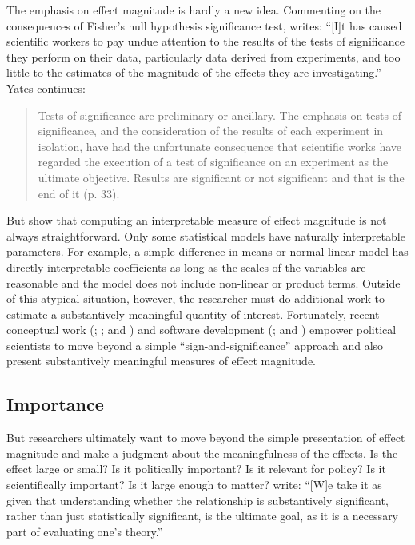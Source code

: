 \documentclass[12pt]{article}
\begin{document}
The emphasis on effect magnitude is hardly a new idea. Commenting on the consequences of Fisher's null hypothesis significance test, \citet[p. 32]{Yates1951} writes: ``[I]t has caused scientific workers to pay undue attention to the results of the tests of significance they perform on their data, particularly data derived from experiments, and too little to the estimates of the magnitude of the effects they are investigating.'' Yates continues: 

\begin{quote}
Tests of significance are preliminary or ancillary. The emphasis on tests of significance, and the consideration of the results of each experiment in isolation, have had the unfortunate consequence that scientific works have regarded the execution of a test of significance on an experiment as the ultimate objective. Results are significant or not significant and that is the end of it (p. 33).
\end{quote}

But \cite{KingTomzWittenberg2000} show that computing an interpretable measure of effect magnitude is not always straightforward. Only some statistical models have naturally interpretable parameters. For example, a simple difference-in-means or normal-linear model has directly interpretable coefficients as long as the scales of the variables are reasonable and the model does not include non-linear or product terms. Outside of this atypical situation, however, the researcher must do additional work to estimate a substantively meaningful quantity of interest. Fortunately, recent conceptual work (\citealt{KingTomzWittenberg2000}; \citealt{BerryDeMerittEsarey2010}; and \citealt{HanmerKalkan2013}) and software development (\citealt{TomzWittenbergKing2003}; and \citealt{ImaiKingLau2007}) empower political scientists to move beyond a simple ``sign-and-significance'' approach and also present substantively meaningful measures of effect magnitude. 

\subsection*{Importance}

But researchers ultimately want to move beyond the simple presentation of effect magnitude and make a judgment about the meaningfulness of the effects. Is the effect large or small? Is it politically important? Is it relevant for policy? Is it scientifically important? Is it large enough to matter? \citet[p. 264]{HanmerKalkan2013} write: ``[W]e take it as given that understanding whether the relationship is substantively significant, rather than just statistically significant, is the ultimate goal, as it is a necessary part of evaluating one's theory.''
\end{document}
